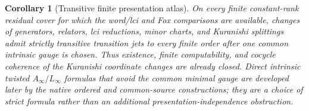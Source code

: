 \documentclass[11pt]{article}
\newtheorem{corollary}[theorem]{Corollary}
\theoremstyle{definition}
\begin{document}
\begin{corollary}[Transitive finite presentation atlas]\label{cor:kuranishi-presentation-atlas}
On every finite constant-rank residual cover for which the word/lci and Fox
comparisons are available, changes of generators, relators, lci reductions,
minor charts, and Kuranishi splittings admit strictly transitive transition
jets to every finite order after one common intrinsic gauge is chosen.  Thus existence, finite computability, and cocycle coherence of the Kuranishi
coordinate changes are already closed.  Direct intrinsic twisted
$A_\infty/L_\infty$ formulas that avoid the common minimal gauge are developed
later by the native ordered and common-source constructions; they are a choice
of strict formula rather than an additional presentation-independence
obstruction.
\end{corollary}
\end{document}
